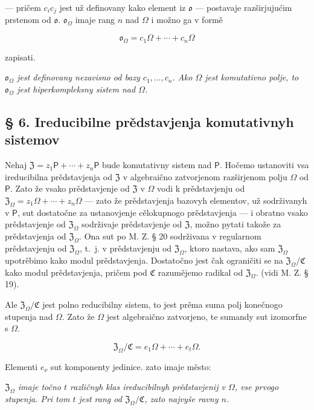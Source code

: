 \documentclass[11pt]{article}
\begin{document}
--- pričem \(c_ic_j\) jest už definovany kako element iz \(\mathfrak{o}\) --- postavaje razširjujućim prstenom od \(\mathfrak{o}\). \(\mathfrak{o}_{\Omega}\) imaje rang \(n\) nad \(\Omega\) i možno ga v formě

\[
\mathfrak{o}_{\Omega}=c_1\Omega+\cdots+c_n\Omega
\]

zapisati.

\emph{\(\mathfrak{o}_{\Omega}\) jest definovany nezavisno od bazy \(c_1,\ldots,c_n\). Ako \(\Omega\) jest komutativno polje, to \(\mathfrak{o}_{\Omega}\) jest hiperkompleksny sistem nad \(\Omega\).}

\subsection*{§ 6. Ireducibilne prědstavjenja komutativnyh sistemov}\label{die-irreduziblen-darstellungen-kommutativer-systeme}

Nehaj \(\mathfrak Z=z_1\mathsf P+\cdots+z_n\mathsf P\) bude komutativny sistem nad \(\mathsf P\). Hočemo ustanoviti vsa ireducibilna prědstavjenja od \(\mathfrak Z\) v algebraično zatvorjenom razširjenom polju \(\Omega\) od \(\mathsf P\). Zato že vsako prědstavjenje od \(\mathfrak Z\) v \(\Omega\) vodi k prědstavjenju od \(\mathfrak Z_\Omega=z_1\Omega+\cdots+z_n\Omega\) --- zato že prědstavjenja bazovyh elementov, už sodrživanyh v \(\mathsf P\), sut dostatočne za ustanovjenje cělokupnogo prědstavjenja --- i obratno vsako prědstavjenje od \(\mathfrak Z_\Omega\) sodrživaje prědstavjenje od \(\mathfrak Z\), možno pytati takože za prědstavjenja od \(\mathfrak Z_\Omega\). Ona sut po M. Z. § 20 sodrživana v regularnom prědstavjenju od \(\mathfrak Z_\Omega\), t.~j. v prědstavjenju od \(\mathfrak Z_\Omega\), ktoro nastava, ako sam \(\mathfrak Z_\Omega\) upotrěbimo kako modul prědstavjenja. Dostatočno jest čak ograničiti se na \(\mathfrak Z_\Omega/\mathfrak C\) kako modul prědstavjenja, pričem pod \(\mathfrak C\) razumějemo radikal od \(\mathfrak Z_\Omega\). (vidi M. Z. § 19).

Ale \(\mathfrak Z_\Omega/\mathfrak C\) jest polno reducibilny sistem, to jest prěma suma polj konečnogo stupenja nad \(\Omega\). Zato že \(\Omega\) jest algebraično zatvorjeno, te sumandy sut izomorfne s \(\Omega\).

\[
\mathfrak Z_\Omega/\mathfrak C=e_1\Omega+\cdots+e_t\Omega.
\]

Elementi \(e_\nu\) sut komponenty jedinice. zato imaje město:

\emph{\(\mathfrak Z_\Omega\) imaje točno \(t\) različnyh klas ireducibilnyh prědstavjenij v \(\Omega\), vse prvogo stupenja. Pri tom \(t\) jest rang od \(\mathfrak Z_\Omega/\mathfrak C\), zato najvyše ravny \(n\).}
\end{document}
